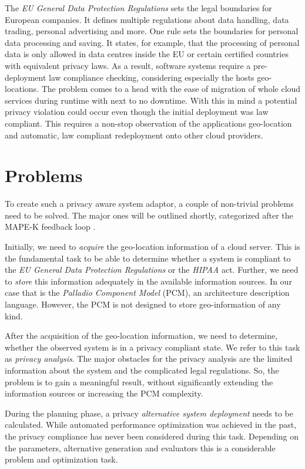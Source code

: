 The \textit{EU General Data Protection Regulations} sets the legal boundaries for European companies. It defines multiple regulations about data handling, data trading, personal advertising and more. One rule sets the boundaries for personal data processing and saving. It states, for example, that the processing of personal data is only allowed in data centres inside the EU or certain certified countries with equivalent privacy laws. As a result, software systems require a pre-deployment law compliance checking, considering especially the hosts geo-locations. The problem comes to a head with the ease of migration of whole cloud services during runtime with next to no downtime. With this in mind a potential privacy violation could occur even though the initial deployment was law compliant. This requires a non-stop observation of the applications geo-location and automatic, law compliant redeployment onto other cloud providers.


\section{Problems}
\label{sec:Introduction:problems}

To create such a privacy aware system adaptor, a couple of non-trivial problems need to be solved. The major ones will be outlined shortly, categorized after the MAPE-K feedback loop \cite{Dar.2012}.

Initially, we need to \textit{acquire} the geo-location information of a cloud server. This is the fundamental task to be able to determine whether a system is compliant to the \textit{EU General Data Protection Regulations} or the \textit{HIPAA} act. Further, we need to \textit{store} this information adequately in the available information sources. In our case that is the \textit{Palladio Component Model} (PCM), an architecture description language. However, the PCM is not designed to store geo-information of any kind.

After the acquisition of the geo-location information, we need to determine, whether the observed system is in a privacy compliant state. We refer to this task as \textit{privacy analysis}. The major obstacles for the privacy analysis are the limited information about the system and the complicated legal regulations. So, the problem is to gain a meaningful result, without significantly extending the information sources or increasing the PCM complexity.

During the planning phase, a privacy \textit{alternative system deployment} needs to be calculated. While automated performance optimization was achieved in the past, the privacy compliance has never been considered during this task. Depending on the parameters, alternative generation and evaluators this is a considerable problem and optimization task.

